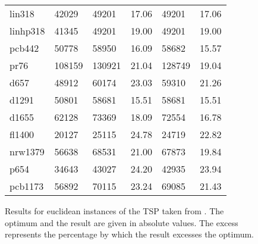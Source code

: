 \begin{figure}[ht]
\begin{minipage}{\linewidth}
\begin{tabular*}{\linewidth}{*{6}{l}}
			lin318   & 42029  & 49201  & 17.06 & 49201  & 17.06 \\
			linhp318 & 41345  & 49201  & 19.00 & 49201  & 19.00 \\
			pcb442   & 50778  & 58950  & 16.09 & 58682  & 15.57 \\
			pr76     & 108159 & 130921 & 21.04 & 128749 & 19.04 \\
			d657     & 48912  & 60174  & 23.03 & 59310  & 21.26 \\
			d1291    & 50801  & 58681  & 15.51 & 58681  & 15.51 \\
			d1655    & 62128  & 73369  & 18.09 & 72554  & 16.78 \\
			fl1400   & 20127  & 25115  & 24.78 & 24719  & 22.82 \\
			nrw1379  & 56638  & 68531  & 21.00 & 67873  & 19.84 \\
			p654     & 34643  & 43027  & 24.20 & 42935  & 23.94 \\
			pcb1173  & 56892  & 70115  & 23.24 & 69085  & 21.43 \\
			\bottomrule
		\end{tabular*}
	\end{minipage}
	
	\caption{Results for  euclidean instances of the TSP taken from \cite{REINELT1995}. The optimum and the result are given in absolute values. The excess represents the percentage by which the result excesses the optimum.}
	\label{fig:STSP}
\end{figure}

